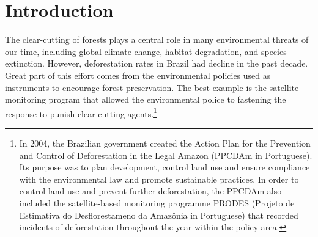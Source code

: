 \section{Introduction}
\label{S:3.1}
The clear-cutting of forests plays a central role in many environmental threats of our time, including global climate change, habitat degradation, and species extinction. However, deforestation rates in Brazil had decline in the past decade. Great part of this effort comes from the environmental policies used as instruments to encourage forest preservation. The best example is the satellite monitoring program that allowed the environmental police to fastening the response to punish clear-cutting agents.\footnote{In 2004, the Brazilian government created the Action Plan for the Prevention and Control of Deforestation in the Legal Amazon (PPCDAm in Portuguese). Its purpose was to plan development, control land use and ensure compliance with the environmental law and promote sustainable practices. In order to control land use and prevent further deforestation, the PPCDAm also included the satellite-based monitoring programme PRODES (Projeto de Estimativa do Desflorestameno da Amaz\^{o}nia in Portuguese) \citep{inpe} that recorded incidents of deforestation throughout the year within the policy area.} %


